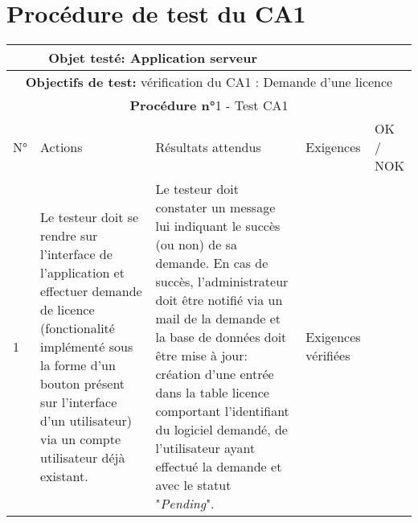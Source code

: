 \section{Procédure de test du CA1}
\begin{table}[!h]
        \centering
        \begin{tabular}{|m{0.6cm}|
                         >{\raggedright\arraybackslash}m{4cm}|
                         >{\raggedright\arraybackslash}m{6.4cm}|
                         >{\raggedright\arraybackslash}m{2cm}|
                         m{1cm}|}
            \hline
            \multicolumn{3}{|c|}{
                \textbf{Objet testé: } Application serveur 
            } & \multicolumn{2}{|c|}{
                \textbf{Version: } version    
            } \\
            \hline
            \multicolumn{5}{|c|}{\textbf{Objectifs de test:} 
                vérification du CA1 : Demande d'une licence} \\
            \hline
            \multicolumn{5}{|c|}{
                \textbf{Procédure n°}1 - Test CA1
            } \\
            \hline
            N° & Actions & Résultats attendus & Exigences & OK / NOK \\
            \hline      %
            1 & Le testeur doit se rendre sur l'interface de l'application et 
                effectuer demande de licence (fonctionalité implémenté 
                sous la forme d'un bouton présent sur l'interface d'un
                utilisateur) via un compte utilisateur déjà existant. 
              & Le testeur doit constater un message lui indiquant le succès (ou non)
                de sa demande. En cas de succès, l'administrateur doit être notifié via 
                un mail de la demande et la base de données doit être mise à jour: 
                création d'une entrée dans la table licence comportant l'identifiant du
                logiciel demandé, de l'utilisateur ayant effectué la demande et avec le 
                statut "\emph{Pending}".
              & Exigences vérifiées & \\
            \hline
        \end{tabular} 
        \label{tab:tab1}
\end{table}
\newpage

